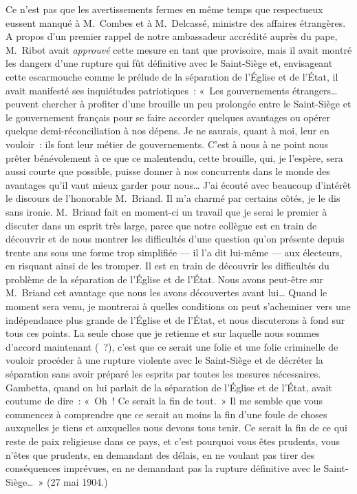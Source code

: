 \documentclass[french,twoside]{book} %
\begin{document}
Ce n’est pas que les avertissements fermes en même temps que respectueux eussent manqué à M. Combes et à M. Delcassé, ministre des affaires étrangères. A propos d’un premier rappel de notre ambassadeur accrédité auprès du pape, M. Ribot avait {\itshape approuvé} cette mesure en tant que provisoire, mais il avait montré les dangers d’une rupture qui fût définitive avec le Saint-Siège et, envisageant cette escarmouche comme le prélude de la séparation de l’Église et de l’État, il avait manifesté ses inquiétudes patriotiques : « Les gouvernements étrangers… peuvent chercher à  profiter d’une brouille un peu prolongée entre le Saint-Siège et le gouvernement français pour se faire accorder quelques avantages ou opérer quelque demi-réconciliation à nos dépens. Je ne saurais, quant à moi, leur en vouloir : ils font leur métier de gouvernements. C’est à nous à ne point nous prêter bénévolement à ce que ce malentendu, cette brouille, qui, je l’espère, sera aussi courte que possible, puisse donner à nos concurrents dans le monde des avantages qu’il vaut mieux garder pour nous… J’ai écouté avec beaucoup d’intérêt le discours de l’honorable M. Briand. Il m’a charmé par certains côtés, je le dis sans ironie. M. Briand fait en moment-ci un travail que je serai le premier à discuter dans un esprit très large, parce que notre collègue est en train de découvrir et de nous montrer les difficultés d’une question qu’on présente depuis trente ans sous une forme trop simplifiée — il l’a dit lui-même — aux électeurs, en risquant ainsi de les tromper. Il est en train de découvrir les difficultés du problème de la séparation de l’Église et de l’État. Nous avons peut-être sur M. Briand cet avantage que nous les avons découvertes avant lui… Quand le moment sera venu, je montrerai à quelles conditions on peut s’acheminer vers une indépendance plus grande de l’Église et de l’État, et nous discuterons à fond sur  tous ces points. La seule chose que je retienne et sur laquelle nous sommes d’accord maintenant ( ?), c’est que ce serait une folie et une folie criminelle de vouloir procéder à une rupture violente avec le Saint-Siège et de décréter la séparation sans avoir préparé les esprits par toutes les mesures nécessaires. Gambetta, quand on lui parlait de la séparation de l’Église et de l’État, avait coutume de dire : « Oh ! Ce serait la fin de tout. » Il me semble que vous commencez à comprendre que ce serait au moins la fin d’une foule de choses auxquelles je tiens et auxquelles nous devons tous tenir. Ce serait la fin de ce qui reste de paix religieuse dans ce pays, et c’est pourquoi vous êtes prudents, vous n’êtes que prudents, en demandant des délais, en ne voulant pas tirer des conséquences imprévues, en ne demandant pas la rupture définitive avec le Saint-Siège… » (27 mai 1904.)\par
\end{document}
